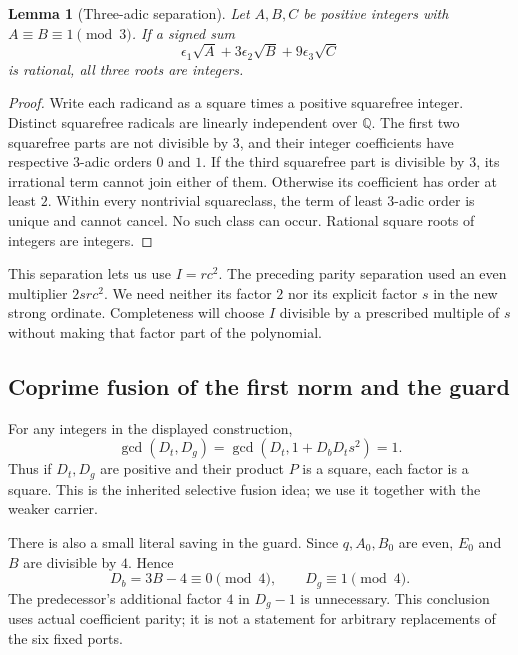 \documentclass[11pt]{article}
\newcommand{\Q}{\mathbb Q}
\newtheorem{lemma}[theorem]{Lemma}
\theoremstyle{definition}
\theoremstyle{remark}
\begin{document}
\begin{lemma}[Three-adic separation]\label{lem:separation}
Let $A,B,C$ be positive integers with $A\equiv B\equiv1\pmod3$.
If a signed sum
\[
 \epsilon_1\sqrt A+3\epsilon_2\sqrt B+9\epsilon_3\sqrt C
\]
is rational, all three roots are integers.
\end{lemma}
\begin{proof}
Write each radicand as a square times a positive squarefree integer.
Distinct squarefree radicals are linearly independent over $\Q$.
The first two squarefree parts are not divisible by $3$, and their
integer coefficients have respective $3$-adic orders $0$ and $1$.
If the third squarefree part is divisible by $3$, its irrational term
cannot join either of them. Otherwise its coefficient has order at
least $2$. Within every nontrivial squareclass, the term of least
$3$-adic order is unique and cannot cancel. No such class can occur.
Rational square roots of integers are integers.
\end{proof}

This separation lets us use $I=rc^2$. The preceding parity separation
used an even multiplier $2src^2$. We need neither its factor $2$ nor
its explicit factor $s$ in the new strong ordinate. Completeness will
choose $I$ divisible by a prescribed multiple of $s$ without making
that factor part of the polynomial.

\subsection{Coprime fusion of the first norm and the guard}
For any integers in the displayed construction,
\begin{equation}\label{eq:coprime}
 \gcd(D_t,D_g)=\gcd(D_t,1+D_bD_ts^2)=1.
\end{equation}
Thus if $D_t,D_g$ are positive and their product $P$ is a square,
each factor is a square. This is the inherited selective fusion idea;
we use it together with the weaker carrier.

There is also a small literal saving in the guard. Since $q,A_0,B_0$
are even, $E_0$ and $B$ are divisible by $4$. Hence
\begin{equation}\label{eq:guardparity}
 D_b=3B-4\equiv0\pmod4,\qquad D_g\equiv1\pmod4.
\end{equation}
The predecessor's additional factor $4$ in $D_g-1$ is unnecessary.
This conclusion uses actual coefficient parity; it is not a statement
for arbitrary replacements of the six fixed ports.
\end{document}
